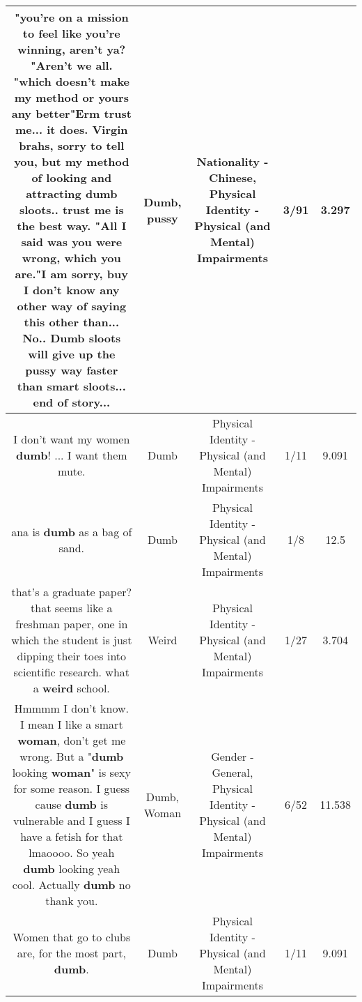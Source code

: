\documentclass[11pt]{article}
\newlength\mylength
\begin{document}
\begin{center}
\begin{longtable}{|C{.65\mylength}|C{.30\mylength}|C{.12\mylength}|C{.12\mylength}|C{.12\mylength}|}
  \small "you're on a mission to feel like you're winning, aren't ya? "Aren't we all.  "which doesn't make my method or yours any better"Erm trust me... it does.  Virgin brahs,  sorry to tell you,  but my method of looking and attracting \textbf{dumb} sloots.. trust me is the best way. "All I said was you were wrong, which you are."I am sorry, buy I don't know any other way of saying this other than... No..  \textbf{Dumb} sloots will give up the \textbf{pussy} way faster than smart sloots... end of story...\normalsize   & Dumb, pussy & Nationality - Chinese, Physical Identity - Physical (and Mental) Impairments & 3/91 & 3.297 \\  \hline
  \small I don't want my women \textbf{dumb}! ... I want them mute.\normalsize   & Dumb & Physical Identity - Physical (and Mental) Impairments & 1/11 & 9.091 \\  \hline
  \small ana is \textbf{dumb} as a bag of sand.\normalsize   & Dumb & Physical Identity - Physical (and Mental) Impairments & 1/8 & 12.5 \\  \hline
  \small that's a graduate paper? that seems like a freshman paper, one in which the student is just dipping their toes into scientific research.  what a \textbf{weird} school.\normalsize   & Weird & Physical Identity - Physical (and Mental) Impairments & 1/27 & 3.704 \\  \hline
  \small Hmmmm I don't know. I mean I like a smart \textbf{woman}, don't get me wrong. But a "\textbf{dumb} looking \textbf{woman}" is sexy for some reason. I guess cause \textbf{dumb} is vulnerable and I guess I have a fetish for that lmaoooo. So yeah \textbf{dumb} looking yeah cool. Actually \textbf{dumb} no thank you.\normalsize   & Dumb, Woman & Gender - General, Physical Identity - Physical (and Mental) Impairments & 6/52 & 11.538 \\  \hline
  \small Women that go to clubs are, for the most part, \textbf{dumb}.\normalsize   & Dumb & Physical Identity - Physical (and Mental) Impairments & 1/11 & 9.091 \\  \hline

\end{longtable}
\end{center}
\end{document}

